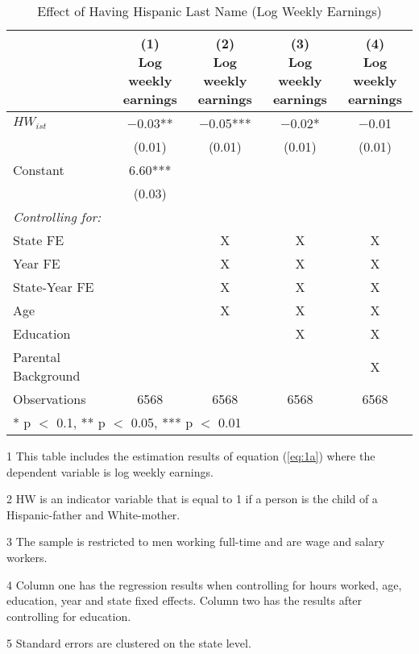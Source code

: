 \begin{table}[H]
\centering\centering
\caption{Effect of Having Hispanic Last Name (Log Weekly Earnings) \label{tab:lastnamereg-weekearm}}
\centering
\begin{threeparttable}
\begin{tabular}[t]{lcccc}
\toprule
  & \specialcell{(1) \\ Log weekly \\ earnings} & \specialcell{(2) \\ Log weekly \\ earnings} & \specialcell{(3) \\  Log weekly \\ earnings} & \specialcell{(4) \\  Log weekly \\ earnings}\\
\midrule
$HW_{ist}$ & \num{-0.03}** & \num{-0.05}*** & \num{-0.02}* & \num{-0.01}\\
 & (\num{0.01}) & (\num{0.01}) & (\num{0.01}) & (\num{0.01})\\
Constant & \num{6.60}*** &  &  & \\
 & (\num{0.03}) &  &  & \\
\midrule
\textit{Controlling for:} &  &  &  & \\
State FE &  & X & X & X\\
Year FE &  & X & X & X\\
State-Year FE &  & X & X & X\\
Age &  & X & X & X\\
Education &  &  & X & X\\
Parental Background &  &  &  & X\\
Observations & \num{6568} & \num{6568} & \num{6568} & \num{6568}\\
\bottomrule
\multicolumn{5}{l}{\rule{0pt}{1em}* p $<$ 0.1, ** p $<$ 0.05, *** p $<$ 0.01}\\
\end{tabular}
\begin{tablenotes}
\item[1] {\footnotesize{This table includes the estimation results of equation (\ref{eq:1a}) where the dependent variable is log weekly earnings.}}
\item[2] {\footnotesize{HW is an indicator variable that is equal to 1 if a person is the child of a Hispanic-father and White-mother.}}
\item[3] {\footnotesize{The sample is restricted to men working full-time and are wage and salary workers.}}
\item[4] {\footnotesize{Column one has the regression results when controlling for hours worked, age, education, year and state fixed effects. Column two has the results after controlling for education.}}
\item[5] {\footnotesize{Standard errors are clustered on the state level.}}
\end{tablenotes}
\end{threeparttable}
\end{table}
